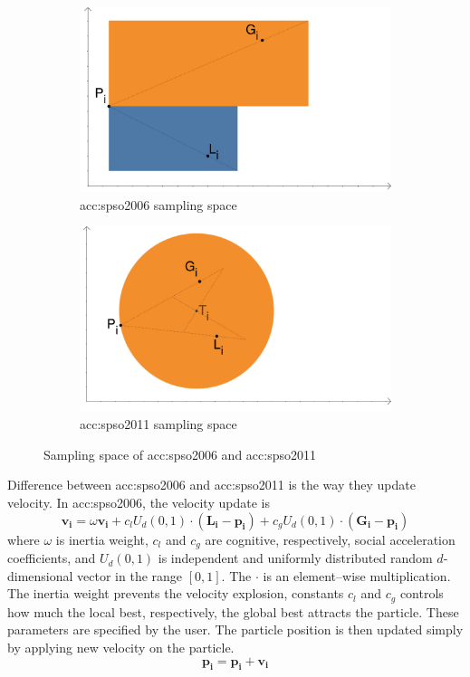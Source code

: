 \begin{figure}[t]
    \begin{subfigure}[t]{0.45\textwidth}
        \includegraphics[width=\textwidth]{img/pso2006.pdf}
        \caption{\acrshort*{acc:spso2006} sampling space}
        \label{fig:samplingspso2006}
    \end{subfigure}
    \hfill
    \begin{subfigure}[t]{0.45\textwidth}
        \includegraphics[width=\textwidth]{img/pso2011.pdf}
        \caption{\acrshort*{acc:spso2011} sampling space}
        \label{fig:samplingspso2011}
    \end{subfigure}
    \caption{Sampling space of \acrshort*{acc:spso2006} and \acrshort*{acc:spso2011}}
\end{figure}

Difference between \acrshort{acc:spso2006} and \acrshort{acc:spso2011} is the way they update velocity. In \acrshort{acc:spso2006}, the velocity update is
$$
\mathbf{v_i} = \omega\mathbf{v_i} 
+ c_l U_d\left( 0,1 \right) \cdot \left( \mathbf{L_i} - \mathbf{p_i} \right)
+ c_g U_d\left( 0,1 \right) \cdot \left( \mathbf{G_i} - \mathbf{p_i} \right)
$$ 
where $\omega$ is inertia weight, $c_l$ and $c_g$ are cognitive, respectively, social acceleration coefficients, and $U_d(0,1)$ is independent and uniformly distributed random $d$-dimensional vector in the range $\left[ 0,1 \right]$. The $\cdot$ is an element--wise multiplication. The inertia weight prevents the velocity explosion, constants $c_l$ and $c_g$ controls how much the local best, respectively, the global best attracts the particle. These parameters are specified by the user. The particle position is then updated simply by applying new velocity on the particle.
$$
\mathbf{p_i} = \mathbf{p_i} + \mathbf{v_i}
$$

